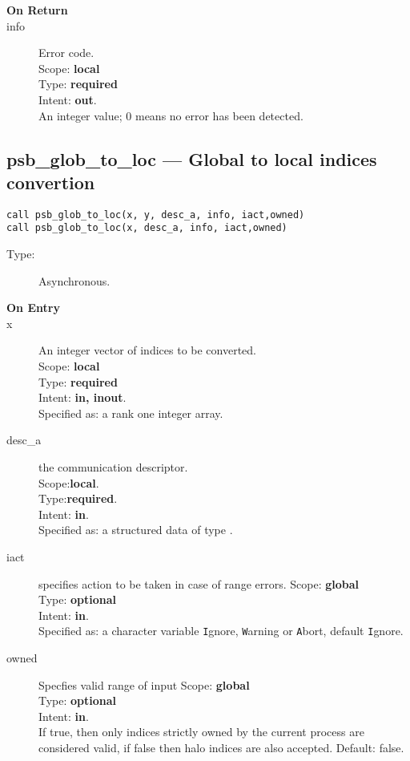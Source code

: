 \begin{description}
\item[\bf On Return]
\item[info] Error code.\\
Scope: {\bf local} \\
Type: {\bf required} \\
Intent: {\bf out}.\\
An integer value; 0 means no error has been detected. 
\end{description}


%
%
\clearpage\subsection{psb\_glob\_to\_loc --- Global to local indices
  convertion}

\begin{verbatim}
call psb_glob_to_loc(x, y, desc_a, info, iact,owned)
call psb_glob_to_loc(x, desc_a, info, iact,owned)
\end{verbatim}

\begin{description}
\item[Type:] Asynchronous.
\item[\bf On Entry]
\item[x] An integer vector of indices to be converted.\\
Scope: {\bf local} \\
Type: {\bf required}\\
Intent: {\bf in, inout}.\\
Specified as: a rank one integer array.\\
\item[desc\_a] the communication descriptor.\\
Scope:{\bf local}.\\
Type:{\bf required}.\\
Intent: {\bf in}.\\
Specified as: a structured data of type \descdata.
\item[iact] specifies action to be taken in case of range errors. 
Scope: {\bf global} \\
Type: {\bf optional}\\
Intent: {\bf in}.\\
Specified as: a character variable  \verb|I|gnore, \verb|W|arning or
\verb|A|bort, default \verb|I|gnore.
\item[owned] Specfies valid range of input 
Scope: {\bf global} \\
Type: {\bf optional}\\
Intent: {\bf in}.\\
If true, then only indices strictly owned by the current process are
considered valid, if false then halo indices are also
accepted. Default: false. 
\end{description}

